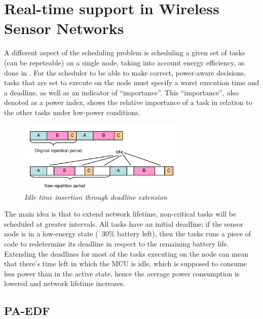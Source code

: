 \section{Real-time support in Wireless Sensor Networks}

A different aspect of the scheduling problem is scheduling a given set of tasks (can be repeteable) on a single node, taking into account energy efficiency, as done
in \cite{Deli2005}. For the scheduler to be able to make correct, power-aware decisions, tasks that are set to execute on the node must specify a worst 
execution time and a deadline, as well as an indicator of ``importance''. This ``importance'', also denoted as a power index, shows the relative importance 
of a task in relation to the other tasks under low-power conditions. 

\begin{figure}
  \begin{center}
  \vspace{-20pt}
    \includegraphics[width=80mm]{related/idle.png}
  \end{center}
  \caption{\small \itshape{Idle time insertion through deadline extension}}
\end{figure}

The main idea is that to extend network lifetime, non-critical tasks will be scheduled at greater intervals. All tasks have an initial deadline; if the sensor node
is in a low-energy state (~30\% battery left), then the tasks runs a piece of code to redetermine its deadline in respect to the remaining battery life. 
Extending the deadlines for most of the tasks executing on the node can mean that there's time left in which the MCU is idle, which is supposed to consume
less power than in the active state, hence the average power consumption is lowered and network lifetime increases.

\subsection{PA-EDF}


